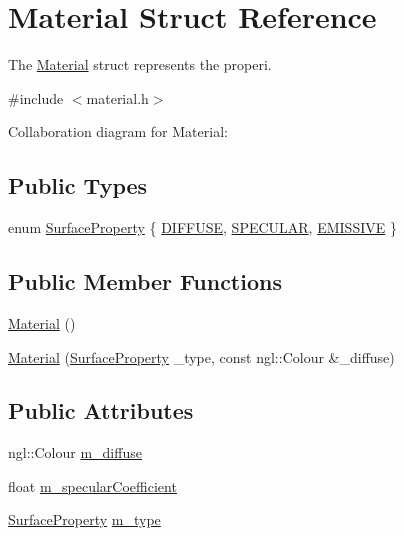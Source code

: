 \hypertarget{structMaterial}{}\section{Material Struct Reference}
\label{structMaterial}


The \hyperlink{structMaterial}{Material} struct represents the properi.  




{\ttfamily \#include $<$material.\+h$>$}



Collaboration diagram for Material\+:
\subsection*{Public Types}
\begin{DoxyCompactItemize}
\item 
enum \hyperlink{structMaterial_a20ba0daec5b9ea2e7f2c1ce5ffd882c7}{Surface\+Property} \{ \hyperlink{structMaterial_a20ba0daec5b9ea2e7f2c1ce5ffd882c7a1f17ceafe04d70586701c6d8736dcf00}{D\+I\+F\+F\+U\+S\+E}, 
\hyperlink{structMaterial_a20ba0daec5b9ea2e7f2c1ce5ffd882c7a66b7035936c46b641aa4a552e85547bf}{S\+P\+E\+C\+U\+L\+A\+R}, 
\hyperlink{structMaterial_a20ba0daec5b9ea2e7f2c1ce5ffd882c7a33f0bc9cf55afdd237745adc43f9c478}{E\+M\+I\+S\+S\+I\+V\+E}
 \}
\end{DoxyCompactItemize}
\subsection*{Public Member Functions}
\begin{DoxyCompactItemize}
\item 
\hyperlink{structMaterial_a137e987401b63eb7c6c27c3e38bc74b5}{Material} ()
\item 
\hyperlink{structMaterial_a7c6b26aab15e38ab4381a710f176c4a3}{Material} (\hyperlink{structMaterial_a20ba0daec5b9ea2e7f2c1ce5ffd882c7}{Surface\+Property} \+\_\+type, const ngl\+::\+Colour \&\+\_\+diffuse)
\end{DoxyCompactItemize}
\subsection*{Public Attributes}
\begin{DoxyCompactItemize}
\item 
ngl\+::\+Colour \hyperlink{structMaterial_a2da5909aa70508688864dbc7f7559306}{m\+\_\+diffuse}
\item 
float \hyperlink{structMaterial_aecf39c59a7f6010888fa3095fc013a0f}{m\+\_\+specular\+Coefficient}
\item 
\hyperlink{structMaterial_a20ba0daec5b9ea2e7f2c1ce5ffd882c7}{Surface\+Property} \hyperlink{structMaterial_a25bc4627b427de86ba7ca89ce3dc883f}{m\+\_\+type}
\end{DoxyCompactItemize}


